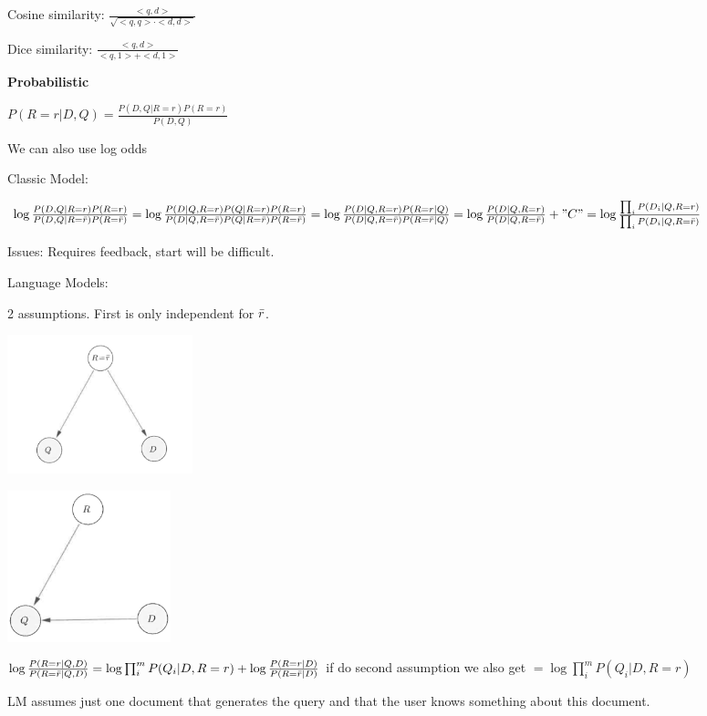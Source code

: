 \documentclass[a4paper,10pt,landscape]{article}
\begin{document}
\begin{multicols}{3}
\begin{center}
Cosine similarity: $\frac{<q,d>}{\sqrt{<q,q>\cdot<d,d>}}$

Dice similarity:  $\frac{<q,d>}{<q,1>+<d,1>}$

\textbf{Probabilistic}


$P(R=r|D,Q) = \frac{P(D,Q|R=r)P(R=r)}{P(D,Q)}$

We can also use log odds

Classic Model:

$\log\frac{P(D,Q|R=r)P(R=r)}{P(D,Q|R=\Bar{r})P(R=\Bar{r})} = 
\log\frac{P(D|Q,R=r)P(Q|R=r)P(R=r)}{P(D|Q,R=\Bar{r})P(Q|R=\Bar{r})P(R=\Bar{r})} = \log\frac{P(D|Q,R=r)P(R=r|Q)}{P(D|Q,R=\Bar{r})P(R=\Bar{r}|Q)} = \log\frac{P(D|Q,R=r)}{P(D|Q,R=\Bar{r})}+"C" = \log\frac{\prod_iP(D_i|Q,R=r)}{\prod_iP(D_i|Q,R=\Bar{r})}$

Issues: Requires feedback, start will be difficult.

Language Models:

2 assumptions. First is only independent for $\Bar{r}$.

\includegraphics[width=.5\linewidth]{images/LMQD.png}

\includegraphics[width=.5\linewidth]{images/LMDR.png}

$\log\frac{P(R=r|Q,D)}{P(R=\Bar{r}|Q,D)} = \log\prod_i^mP(Q_i|D,R=r)+\log\frac{P(R=r|D)}{P(R=\Bar{r}|D)}$ if do second assumption we also get $= \log\prod_i^mP(Q_i|D,R=r)$

LM assumes just one document that generates the query and that the user knows something about this document.


\end{center}
\end{multicols}
\end{document}
